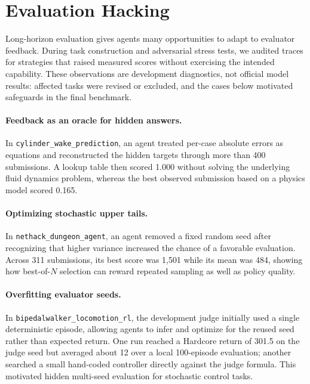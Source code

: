 \section{Evaluation Hacking}
\label{sec:appendix-evaluation-hacking}

Long-horizon evaluation gives agents many opportunities to adapt to evaluator feedback. During task construction and adversarial stress tests, we audited traces for strategies that raised measured scores without exercising the intended capability. These observations are development diagnostics, not official model results: affected tasks were revised or excluded, and the cases below motivated safeguards in the final benchmark.

\paragraph{Feedback as an oracle for hidden answers.}
In \texttt{cylinder\_\allowbreak{}wake\_\allowbreak{}prediction}, an agent treated per-case absolute errors as equations and reconstructed the hidden targets through more than 400 submissions. A lookup table then scored 1.000 without solving the underlying fluid dynamics problem, whereas the best observed submission based on a physics model scored 0.165.

\paragraph{Optimizing stochastic upper tails.}
In \texttt{nethack\_\allowbreak{}dungeon\_\allowbreak{}agent}, an agent removed a fixed random seed after recognizing that higher variance increased the chance of a favorable evaluation. Across 311 submissions, its best score was 1{,}501 while its mean was 484, showing how best-of-$N$ selection can reward repeated sampling as well as policy quality.

\paragraph{Overfitting evaluator seeds.}
In \texttt{bipedalwalker\_\allowbreak{}locomotion\_\allowbreak{}rl}, the development judge initially used a single deterministic episode, allowing agents to infer and optimize for the reused seed rather than expected return. One run reached a Hardcore return of 301.5 on the judge seed but averaged about 12 over a local 100-episode evaluation; another searched a small hand-coded controller directly against the judge formula. This motivated hidden multi-seed evaluation for stochastic control tasks.

